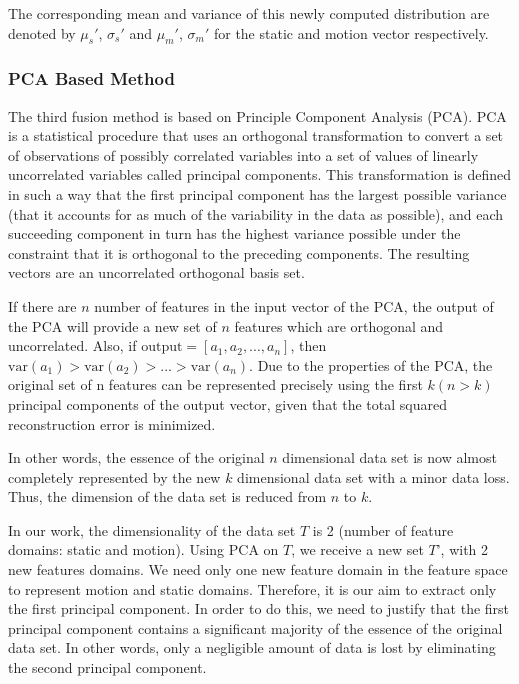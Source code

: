 The corresponding mean and variance of this newly computed distribution are denoted by $\mu_s'$, $\sigma_s'$ and $\mu_m'$, $\sigma_m'$ for the static and motion vector respectively.

\subsubsection{PCA Based Method}

The third fusion method is based on Principle Component Analysis (PCA). PCA is a statistical procedure that uses an orthogonal transformation to convert a
set of observations of possibly correlated variables into a set of values of linearly uncorrelated
variables called principal components. This transformation is defined in such a way that the first
principal component has the largest possible variance (that it accounts for as much of the
variability in the data as possible), and each succeeding component in turn has the highest
variance possible under the constraint that it is orthogonal to the preceding components. The
resulting vectors are an uncorrelated orthogonal basis set.

If there are $n$ number of features in the input vector of the PCA, the output of the
PCA will provide a new set of $n$ features which are orthogonal and uncorrelated. Also, if
$\mathrm{output} =[a_{1}, a_{2}, ..., a_{n}]$, then $\mathrm{var}(a_{1})> \mathrm{var}(a_{2})> \dots > \mathrm{var} (a_{n})$.
Due to the properties of the PCA, the original set of n features can be
represented precisely using the first $k (n>k)$ principal
components of the output vector, given that the total squared reconstruction error
is minimized.

In other words, the essence of the original $n$ dimensional data set is now almost
completely represented by the new $k$ dimensional data set with a minor data loss. Thus, the
dimension of the data set is reduced from $n$ to $k$.


In our work, the dimensionality of the data set $T$ is 2 (number of feature domains: static
and motion).
Using PCA on $T$, we receive a new set $T$', with 2 new features domains. We need only one new feature
domain in the feature space to
represent motion and static domains. Therefore, it is our aim to extract only the first principal component.
In order to do this, we need to justify that the first principal component contains a significant majority of
the essence of the original data set. In other words, only a negligible amount of data is lost by
eliminating the second principal component.

